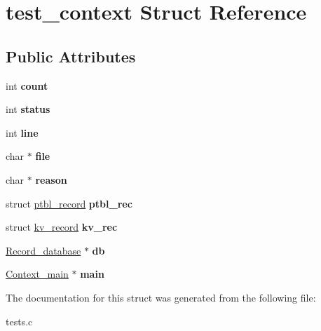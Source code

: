 \hypertarget{structtest__context}{}\section{test\+\_\+context Struct Reference}
\label{structtest__context}
\subsection*{Public Attributes}
\begin{DoxyCompactItemize}
\item 
\mbox{\label{structtest__context_a8fb5ee38e1be8188bedaf985c3c8b070}} 
int {\bfseries count}
\item 
\mbox{\label{structtest__context_a6b9d334f523919564f9f159e38a01543}} 
int {\bfseries status}
\item 
\mbox{\label{structtest__context_af2391f1089e50dc3114e34e02f41ffad}} 
int {\bfseries line}
\item 
\mbox{\label{structtest__context_a922d6943155a445e7ecd2c94f393e5cf}} 
char $\ast$ {\bfseries file}
\item 
\mbox{\label{structtest__context_a8b0fd31c51869fb5c332955d9fc7a62c}} 
char $\ast$ {\bfseries reason}
\item 
\mbox{\label{structtest__context_a1033363f9a2f6349974b7076fe2fe78d}} 
struct \mbox{\hyperlink{structptbl__record}{ptbl\+\_\+record}} {\bfseries ptbl\+\_\+rec}
\item 
\mbox{\label{structtest__context_abda9f17ffeea04d0472b7f8afcbf9670}} 
struct \mbox{\hyperlink{structkv__record}{kv\+\_\+record}} {\bfseries kv\+\_\+rec}
\item 
\mbox{\label{structtest__context_af96dbd9fa4cf6eecf6c2f8ba2f89036f}} 
\mbox{\hyperlink{records_8h_a118c356dd22b00a42d98dd7fde83d565}{Record\+\_\+database}} $\ast$ {\bfseries db}
\item 
\mbox{\label{structtest__context_ad483c78e5db25804ebe8ad6dc7ae1179}} 
\mbox{\hyperlink{context_8h_a6769b7c56d4fa4864da5611ab3079613}{Context\+\_\+main}} $\ast$ {\bfseries main}
\end{DoxyCompactItemize}


The documentation for this struct was generated from the following file\+:\begin{DoxyCompactItemize}
\item 
tests.\+c\end{DoxyCompactItemize}
